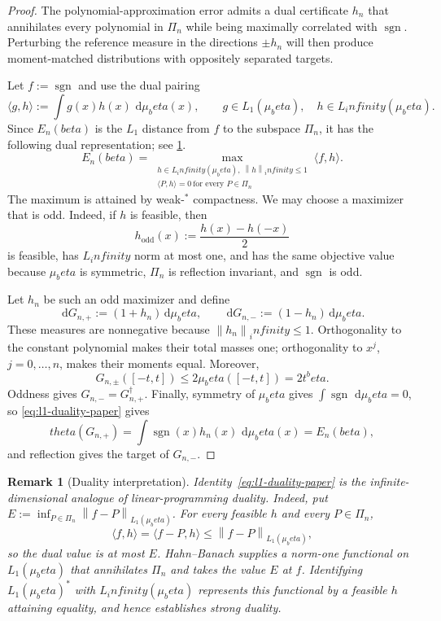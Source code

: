 \documentclass[11pt]{article}
\def\beta{beta}%
\def\theta{theta}%
\def\infty{infinity}%
\newtheorem{remark}[theorem]{Remark}
\newcommand{\sgn}{\operatorname{sgn}}
\newcommand{\norm}[1]{\left\lVert#1\right\rVert}
\newcommand{\dd}{\,\mathrm d}
\newcommand\eed[1]{{\color{green!45!black} #1}}
\begin{document}
\begin{proof}
The polynomial-approximation error admits a dual certificate $h_n$ that annihilates every polynomial in $\Pi_n$ while being maximally correlated with $\sgn$.  Perturbing the reference measure in the directions $\pm h_n$ will then produce moment-matched distributions with oppositely separated targets.

Let $f:=\sgn$ and use the dual pairing
\[
\langle g,h\rangle
:=
\int g(x)h(x)\,\dd\mu_\beta(x),
\qquad
g\in L_1(\mu_\beta),\quad h\in L_\infty(\mu_\beta).
\]
\eed{Since $E_n(\beta)$ is the $L_1$ distance from $f$ to the subspace $\Pi_n$, it has the following dual representation; see \cref{rem:l1-duality}.}
\begin{equation}
\label{eq:l1-duality-paper}
E_n(\beta)
=
\max_{\substack{h\in L_\infty(\mu_\beta),\ \norm h_\infty\le1\\
\langle P,h\rangle=0\ \text{for every }P\in\Pi_n}}
\langle f,h\rangle.
\end{equation}
The maximum is attained by weak-$^*$ compactness.  We may choose a maximizer that is odd.  Indeed, if $h$ is feasible, then
\[
h_{\mathrm{odd}}(x):=\frac{h(x)-h(-x)}2
\]
is feasible, has $L_\infty$ norm at most one, and has the same objective value because $\mu_\beta$ is symmetric, $\Pi_n$ is reflection invariant, and $\sgn$ is odd.

Let $h_n$ be such an odd maximizer and define
\[
\dd G_{n,+}:=(1+h_n)\dd\mu_\beta,
\qquad
\dd G_{n,-}:=(1-h_n)\dd\mu_\beta.
\]
These measures are nonnegative because $\norm{h_n}_\infty\le1$.  Orthogonality to the constant polynomial makes their total masses one; orthogonality to $x^j$, $j=0,\dots,n$, makes their moments equal.  Moreover,
\[
G_{n,\pm}([-t,t])
\le
2\mu_\beta([-t,t])
=
2t^\beta.
\]
Oddness gives $G_{n,-}=G_{n,+}^\dagger$.  Finally, symmetry of $\mu_\beta$ gives $\int\sgn\,\dd\mu_\beta=0$, so \eqref{eq:l1-duality-paper} gives
\[
\theta(G_{n,+})
=
\int\sgn(x)h_n(x)\,\dd\mu_\beta(x)
=
E_n(\beta),
\]
and reflection gives the target of $G_{n,-}$.
\end{proof}

\begin{remark}[Duality interpretation]
\label{rem:l1-duality}
\eed{Identity~\eqref{eq:l1-duality-paper} is the infinite-dimensional analogue of linear-programming duality.  Indeed, put $E:=\inf_{P\in\Pi_n}\norm{f-P}_{L_1(\mu_\beta)}$.  For every feasible $h$ and every $P\in\Pi_n$,
\[
\langle f,h\rangle
=
\langle f-P,h\rangle
\le
\norm{f-P}_{L_1(\mu_\beta)},
\]
so the dual value is at most $E$.  Hahn--Banach supplies a norm-one functional on $L_1(\mu_\beta)$ that annihilates $\Pi_n$ and takes the value $E$ at $f$.  Identifying $L_1(\mu_\beta)^*$ with $L_\infty(\mu_\beta)$ represents this functional by a feasible $h$ attaining equality, and hence establishes strong duality.}
\end{remark}
\end{document}
